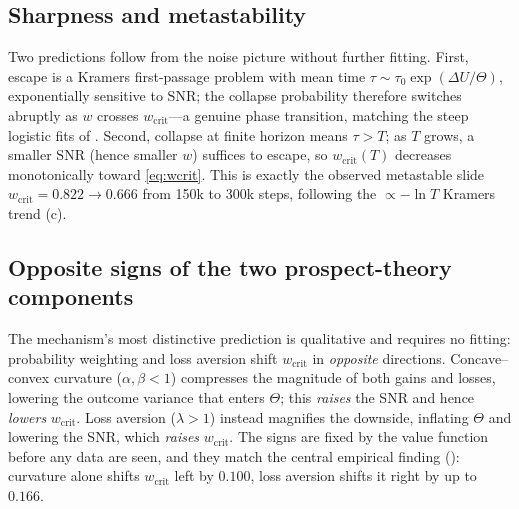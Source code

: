 \documentclass[11pt]{article}
\newcommand{\wcrit}{w_{\mathrm{crit}}}
\begin{document}
\subsection{Sharpness and metastability}
Two predictions follow from the noise picture without further fitting.
First, escape is a Kramers first-passage problem with mean time
$\tau\sim\tau_0\exp(\Delta U/\Theta)$, exponentially sensitive to
$\mathrm{SNR}$; the collapse probability therefore switches abruptly as $w$
crosses $\wcrit$---a genuine phase transition, matching the steep logistic
fits of . Second, collapse at finite horizon
means $\tau>T$; as $T$ grows, a smaller $\mathrm{SNR}$ (hence smaller $w$)
suffices to escape, so $\wcrit(T)$ decreases monotonically toward
\eqref{eq:wcrit}. This is exactly the observed metastable slide
$\wcrit=0.822\!\to\!0.666$ from 150k to 300k steps, following the
$\propto-\ln T$ Kramers trend (c).

\subsection{Opposite signs of the two prospect-theory components}
The mechanism's most distinctive prediction is qualitative and requires no
fitting: probability weighting and loss aversion shift $\wcrit$ in
\emph{opposite} directions. Concave--convex curvature ($\alpha,\beta<1$)
compresses the magnitude of both gains and losses, lowering the outcome
variance that enters $\Theta$; this \emph{raises} the SNR and hence
\emph{lowers} $\wcrit$. Loss aversion ($\lambda>1$) instead magnifies the
downside, inflating $\Theta$ and lowering the SNR, which \emph{raises}
$\wcrit$. The signs are fixed by the value function before any data are
seen, and they match the central empirical finding
(): curvature alone shifts $\wcrit$ left by
$0.100$, loss aversion shifts it right by up to $0.166$.
\end{document}

